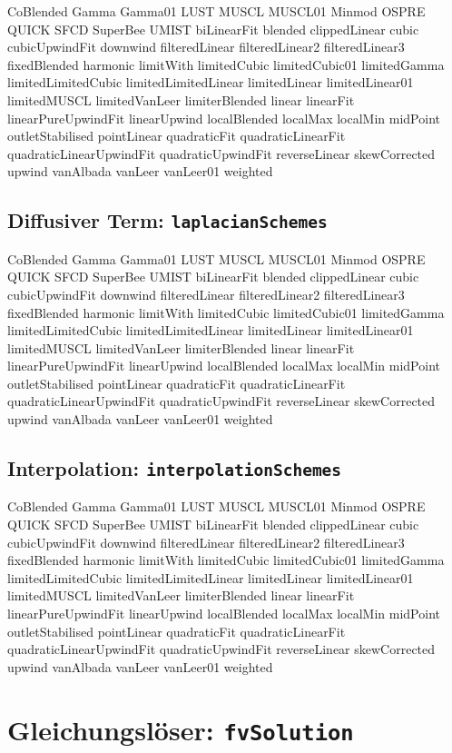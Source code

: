 CoBlended
Gamma
Gamma01
LUST
MUSCL
MUSCL01
Minmod
OSPRE
QUICK
SFCD
SuperBee
UMIST
biLinearFit
blended
clippedLinear
cubic
cubicUpwindFit
downwind
filteredLinear
filteredLinear2
filteredLinear3
fixedBlended
harmonic
limitWith
limitedCubic
limitedCubic01
limitedGamma
limitedLimitedCubic
limitedLimitedLinear
limitedLinear
limitedLinear01
limitedMUSCL
limitedVanLeer
limiterBlended
linear
linearFit
linearPureUpwindFit
linearUpwind
localBlended
localMax
localMin
midPoint
outletStabilised
pointLinear
quadraticFit
quadraticLinearFit
quadraticLinearUpwindFit
quadraticUpwindFit
reverseLinear
skewCorrected
upwind
vanAlbada
vanLeer
vanLeer01
weighted

\subsection{Diffusiver Term: \texttt{laplacianSchemes}}

CoBlended
Gamma
Gamma01
LUST
MUSCL
MUSCL01
Minmod
OSPRE
QUICK
SFCD
SuperBee
UMIST
biLinearFit
blended
clippedLinear
cubic
cubicUpwindFit
downwind
filteredLinear
filteredLinear2
filteredLinear3
fixedBlended
harmonic
limitWith
limitedCubic
limitedCubic01
limitedGamma
limitedLimitedCubic
limitedLimitedLinear
limitedLinear
limitedLinear01
limitedMUSCL
limitedVanLeer
limiterBlended
linear
linearFit
linearPureUpwindFit
linearUpwind
localBlended
localMax
localMin
midPoint
outletStabilised
pointLinear
quadraticFit
quadraticLinearFit
quadraticLinearUpwindFit
quadraticUpwindFit
reverseLinear
skewCorrected
upwind
vanAlbada
vanLeer
vanLeer01
weighted


\subsection{Interpolation: \texttt{interpolationSchemes}}

CoBlended
Gamma
Gamma01
LUST
MUSCL
MUSCL01
Minmod
OSPRE
QUICK
SFCD
SuperBee
UMIST
biLinearFit
blended
clippedLinear
cubic
cubicUpwindFit
downwind
filteredLinear
filteredLinear2
filteredLinear3
fixedBlended
harmonic
limitWith
limitedCubic
limitedCubic01
limitedGamma
limitedLimitedCubic
limitedLimitedLinear
limitedLinear
limitedLinear01
limitedMUSCL
limitedVanLeer
limiterBlended
linear
linearFit
linearPureUpwindFit
linearUpwind
localBlended
localMax
localMin
midPoint
outletStabilised
pointLinear
quadraticFit
quadraticLinearFit
quadraticLinearUpwindFit
quadraticUpwindFit
reverseLinear
skewCorrected
upwind
vanAlbada
vanLeer
vanLeer01
weighted


\section{Gleichungslöser: \texttt{fvSolution}}

